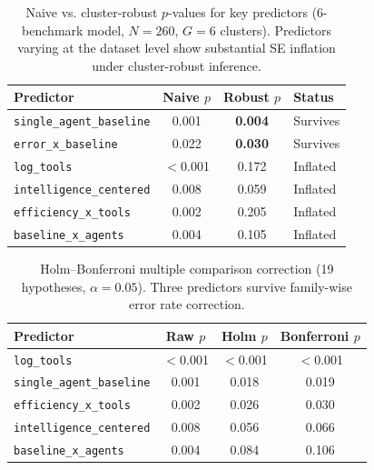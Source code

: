 \begin{table}[h]
\centering
\small
\caption{Naive vs. cluster-robust $p$-values for key predictors (6-benchmark model, $N=260$, $G=6$ clusters). Predictors varying at the dataset level show substantial SE inflation under cluster-robust inference.}
\begin{tabular}{lccl}
\toprule
\textbf{Predictor} & \textbf{Naive $p$} & \textbf{Robust $p$} & \textbf{Status} \\
\midrule
\texttt{single\_agent\_baseline} & 0.001 & \textbf{0.004} & Survives \\
\texttt{error\_x\_baseline} & 0.022 & \textbf{0.030} & Survives \\
\texttt{log\_tools} & $<$0.001 & 0.172 & Inflated \\
\texttt{intelligence\_centered} & 0.008 & 0.059 & Inflated \\
\texttt{efficiency\_x\_tools} & 0.002 & 0.205 & Inflated \\
\texttt{baseline\_x\_agents} & 0.004 & 0.105 & Inflated \\
\bottomrule
\end{tabular}
\label{tab:s4_cluster}
\end{table}

\begin{table}[h]
\centering
\small
\caption{Holm--Bonferroni multiple comparison correction (19 hypotheses, $\alpha=0.05$). Three predictors survive family-wise error rate correction.}
\begin{tabular}{lccc}
\toprule
\textbf{Predictor} & \textbf{Raw $p$} & \textbf{Holm $p$} & \textbf{Bonferroni $p$} \\
\midrule
\texttt{log\_tools} & $<$0.001 & $<$0.001 & $<$0.001 \\
\texttt{single\_agent\_baseline} & 0.001 & 0.018 & 0.019 \\
\texttt{efficiency\_x\_tools} & 0.002 & 0.026 & 0.030 \\
\midrule
\texttt{intelligence\_centered} & 0.008 & 0.056 & 0.066 \\
\texttt{baseline\_x\_agents} & 0.004 & 0.084 & 0.106 \\
\bottomrule
\end{tabular}
\label{tab:s5_holm}
\end{table}


